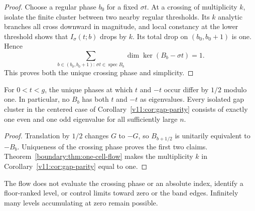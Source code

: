 \begin{proof}
Choose a regular phase $b_0$ for a fixed $\sigma t$.
At a crossing of multiplicity $k$, isolate the finite cluster between
two nearby regular thresholds.  Its $k$ analytic branches all cross
downward in magnitude, and local constancy at the lower threshold
shows that $I_\sigma(t;b)$ drops by $k$.  Its total drop on
$(b_0,b_0+1)$ is one.  Hence
\[
 \sum_{b\in(b_0,b_0+1):\,\sigma t\in\operatorname{spec}B_b}
 \dim\ker(B_b-\sigma t)=1.
\]
This proves both the unique crossing phase and simplicity.
\end{proof}

\begin{corollary}
\label{boundary:cor:opposite-signs}
For $0<t<g$, the unique phases at which $t$ and $-t$ occur differ
by $1/2$ modulo one.  In particular, no $B_b$ has both $t$ and $-t$
as eigenvalues.  Every isolated gap cluster in the centered case of
Corollary~\ref{v11:cor:gap-parity} consists of exactly one even and one
odd eigenvalue for all sufficiently large $n$.
\end{corollary}
\begin{proof}
Translation by $1/2$ changes $G$ to $-G$, so
$B_{b+1/2}$ is unitarily equivalent to $-B_b$.
Uniqueness of the crossing phase proves the first two claims.
Theorem~\ref{boundary:thm:one-cell-flow} makes the multiplicity $k$ in
Corollary~\ref{v11:cor:gap-parity} equal to one.
\end{proof}

The flow does not evaluate the crossing phase or an absolute index,
identify a floor-ranked level, or control limits toward zero or the band
edges. Infinitely many levels accumulating at zero remain possible.

